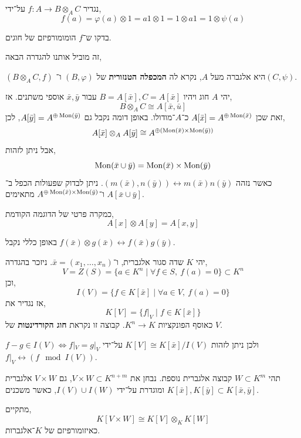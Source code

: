 נגדיר $f : A \to B \otimes_A C$ על־ידי,
\[
	f(a)
	= \varphi(a) \otimes 1
	= a 1 \otimes 1
	= 1 \otimes a 1
	= 1 \otimes \psi(a)
\]
\begin{exercise}
	בדקו ש־$f$ הומומורפיזם של חוגים.
\end{exercise}
זה מוביל אותנו להגדרה הבאה,
\begin{definition}
	$(B \otimes_A C, f)$ היא אלגברה מעל $A$, נקרא לה \textbf{המכפלה הטנזורית} של $(B, \varphi)$ ו־$(C, \psi)$.
\end{definition}
\begin{example}
	יהי $A$ חוג ויהיו $B = A[\bar{x}], C = A[\bar{x}]$ עבור $\bar{x}, \bar{y}$ אוספי משתנים.
	אז,
	\[
		B \otimes_A C
		\cong A[\bar{x}, \bar{u}]
	\]
	זאת שכן $A[\bar{x}] = A^{\oplus \operatorname{Mon}(\bar{x})}$ כ־$A$־מודולו.
	באופן דומה נקבל גם $A[\bar{y}] = A^{\oplus \operatorname{Mon}(\bar{y})}$, לכן,
	\[
		A[\bar{x}] \otimes_A A[\bar{y}]
		\cong A^{\oplus (\operatorname{Mon}(\bar{x}) \times \operatorname{Mon}(\bar{y}))}
	\]
	אבל ניתן לזהות,
	\[
		\operatorname{Mon}(\bar{x} \cup \bar{y})
		= \operatorname{Mon}(\bar{x}) \times \operatorname{Mon}(\bar{y})
	\]
	כאשר נזהה $(m(\bar{x}), n(\bar{y})) \leftrightarrow m(\bar{x}) n(\bar{y})$.
	ניתן לבדוק שפעולות הכפל ב־$A[\bar{x} \cup \bar{y}]$ ו־$A^{\oplus \operatorname{Mon}(\bar{x}) \times \operatorname{Mon}(\bar{y})}$ מתאימים.
\end{example}
\begin{example}
	כמקרה פרטי של הדוגמה הקודמת,
	\[
		A[x] \otimes A[y]
		= A[x, y]
	\]
\end{example}
באופן כללי נקבל $f(\bar{x}) \otimes g(\bar{x}) \leftrightarrow f(\bar{x}) g(\bar{y})$.
\begin{definition}
	יהי $K$ שדה סגור אלגברית, ו־$\bar{x} = (x_1, \ldots, x_n)$.
	ניזכר בהגדרה,
	\[
		V
		= Z(S)
		= \{ a \in K^n \mid \forall f \in S,\ f(a) = 0 \}
		\subset K^n
	\]
	וכן,
	\[
		I(V)
		= \{ f \in K[\bar{x}] \mid \forall a \in V,\ f(a) = 0 \}
	\]
	אז נגדיר את,
	\[
		K[V]
		= \{ f |_V \mid f \in K[\bar{x}] \}
	\]
	כאוסף הפונקציות $K^n \to K$.
	קבוצה זו נקראת \textbf{חוג הקורדינטות} של $V$.
\end{definition}
\begin{remark}
	$f - g \in I(V) \iff f |_V = g |_V$ ולכן ניתן לזהות $K[V] \cong K[\bar{x}] / I(V)$ על־ידי $f |_V \leftrightarrow (f \mod I(V))$.
\end{remark}
תהי $W \subset K^m$ קבוצה אלגברית נוספת.
נבחן את $V \times W \subset K^{n + m}$, גם $V \times W$ אלגברית ומוגדרת על־ידי $I(V) \cup I(W)$,
כאשר משכנים $K[\bar{x}], K[\bar{y}] \subset K[\bar{x}, \bar{y}]$.
\begin{proposition}
	מתקיים,
	\[
		K[V \times W]
		\cong K[V] \otimes_K K[W]
	\]
	כאיזומורפיזם של $K$־אלגברות.
\end{proposition}
